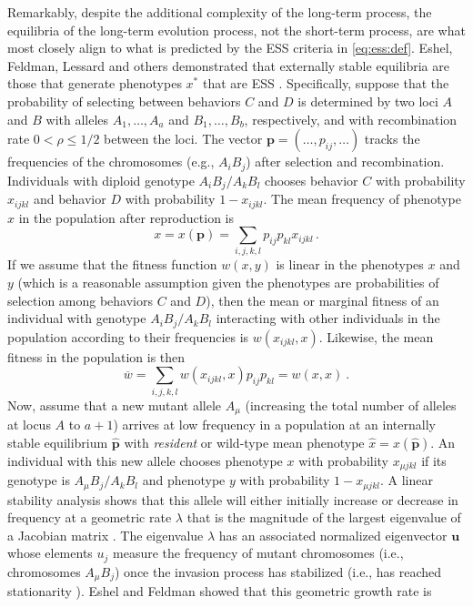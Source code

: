 \documentclass[11pt]{article}
\newcommand{\mean}[1]{\overline{#1}}
\newcommand{\w}{w}
\newcommand{\ess}[1]{#1^*}
\newcommand{\fixp}[1]{\hat{#1}}
\renewcommand{\vec}[1]{\symbf{#1}}
\newcommand{\rec}{\rho}
\newcommand{\mut}{\mu}
\newcommand{\eig}{\lambda}
\begin{document}
Remarkably, despite the additional complexity of the long-term process, the equilibria of the long-term evolution process, not the short-term process, are what most closely align to what is predicted by the ESS criteria in \eqref{eq:ess:def}. Eshel, Feldman, Lessard and others demonstrated that externally stable equilibria are those that generate phenotypes $\ess{x}$ that are ESS \cite{Eshel:Feldman:1984,Liberman:1988,Eshel:1996,Hammerstein:Selten:1994,Hammerstein:1996,Weissing:1996,Eshel:Feldman:1998}. Specifically, suppose that the probability of selecting between behaviors $C$ and $D$ is determined by two loci $A$ and $B$ with alleles $A_{1},\ldots,A_{a}$ and $B_{1},\ldots,B_{b}$, respectively, and with recombination rate $0<\rec\le1/2$ between the loci. The vector $\vec{p} = (\ldots,p_{ij},\ldots)$ tracks the frequencies of the chromosomes (e.g., $A_{i} B_{j}$) after selection and recombination. Individuals with diploid genotype $A_{i}B_{j}/A_{k}B_{l}$ chooses behavior $C$ with probability $x_{ijkl}$ and behavior $D$ with probability $1 - x_{ijkl}$. The mean frequency of phenotype $x$ in the population after reproduction is
\begin{equation*}
  x = x(\vec{p}) = \sum_{i,j,k,l} p_{ij} p_{kl} x_{ijkl} \, .
\end{equation*}
If we assume that the fitness function $\w(x,y)$ is linear in the phenotypes $x$ and $y$ (which is a reasonable assumption given the phenotypes are probabilities of selection among behaviors $C$ and $D$), then the mean or marginal fitness of an individual with genotype $A_{i}B_{j}/A_{k}B_{l}$ interacting with other individuals in the population according to their frequencies is $w(x_{ijkl}, x)$. Likewise, the mean fitness in the population is then
\begin{equation*}
  \mean{w} = \sum_{i,j,k,l} w(x_{ijkl}, x) p_{ij} p_{kl} = w(x, x) \: .
\end{equation*}
Now, assume that a new mutant allele $A_{\mut}$ (increasing the total number of alleles at locus $A$ to $a+1$) arrives at low frequency in a population at an internally stable equilibrium $\fixp{\vec{p}}$ with \textit{resident} or wild-type mean phenotype $\fixp{x} = x(\fixp{\vec{p}})$. An individual with this new allele chooses phenotype $x$ with probability $x_{\mut jkl}$ if its genotype is $A_{\mut}B_{j}/A_{k}B_{l}$ and phenotype $y$ with probability $1 - x_{\mut jkl}$. A linear stability analysis shows that this allele will either initially increase or decrease in frequency at a geometric rate $\eig$ that is the magnitude of the largest eigenvalue of a Jacobian matrix \cite{Edelstein-Keshet:2005}. The eigenvalue $\eig$ has an associated normalized eigenvector $\vec{u}$ whose elements $u_{j}$ measure the frequency of mutant chromosomes (i.e., chromosomes $A_{\mut} B_{j}$) once the invasion process has stabilized (i.e., has reached stationarity \cite{Caswell:2006}). Eshel and Feldman \cite{Eshel:Feldman:1984,Eshel:Feldman:1998} showed that this geometric growth rate is
\end{document}
